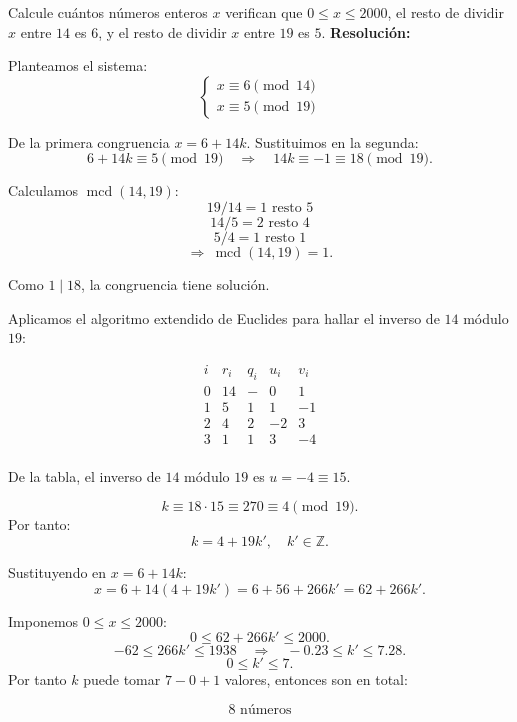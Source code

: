 \documentclass[a4paper,12pt]{article}
\begin{document}
\begin{ejercicio}[title=Ejercicio 38]
Calcule cuántos números enteros $x$ verifican que $0 \le x \le 2000$, el resto de dividir $x$ entre $14$ es $6$, y el resto de dividir $x$ entre $19$ es $5$.
\tcblower
\textbf{Resolución:}

Planteamos el sistema:
\[
\begin{cases}
    x \equiv 6 \pmod{14}\\
    x \equiv 5 \pmod{19}
\end{cases}
\]

De la primera congruencia $x = 6 + 14k$. Sustituimos en la segunda:
\[
6 + 14k \equiv 5 \pmod{19}\quad\Longrightarrow\quad 14k \equiv -1 \equiv 18 \pmod{19}.
\]

Calculamos $\operatorname{mcd}(14,19)$:
\[
19 / 14 = 1 \text{ resto } 5
\]
\[
14 / 5 = 2 \text{ resto } 4
\]
\[
5 / 4 = 1 \text{ resto } \boxed{1}
\]
\[
\Rightarrow\ \operatorname{mcd}(14,19)=\boxed{1}.
\]

Como $1\mid 18$, la congruencia tiene solución.

Aplicamos el algoritmo extendido de Euclides para hallar el inverso de $14$ módulo $19$:

\[
\begin{array}{c|c|c|c|c}
i & r_i & q_i & u_i & v_i \\ \hline
0 & 14 & - & 0 & 1 \\
1 & 5  & 1 & 1 & -1 \\
2 & 4  & 2 & -2 & 3 \\
3 & \boxed{1} & 1 & 3 & -4 \\
\end{array}
\]

De la tabla, el inverso de $14$ módulo $19$ es $u = -4 \equiv 15$.

\[
k \equiv 18\cdot 15 \equiv 270 \equiv 4 \pmod{19}.
\]
Por tanto:
\[
k = 4 + 19k',\quad k'\in \mathbb{Z}.
\]

Sustituyendo en $x = 6 + 14k$:
\[
x = 6 + 14(4 + 19k') = 6 + 56 + 266k' = 62 + 266k'.
\]

Imponemos $0 \le x \le 2000$:
\[
0 \le 62 + 266k' \le 2000.
\]
\[
-62 \le 266k' \le 1938 \quad\Rightarrow\quad -0.23 \le k' \le 7.28.
\]
\[
0 \le k' \le 7.
\]
Por tanto $k$ puede tomar $7-0+1$ valores, entonces son en total:

\[
\boxed{\text{8}\text{ números}}
\]
\end{ejercicio}
\end{document}

